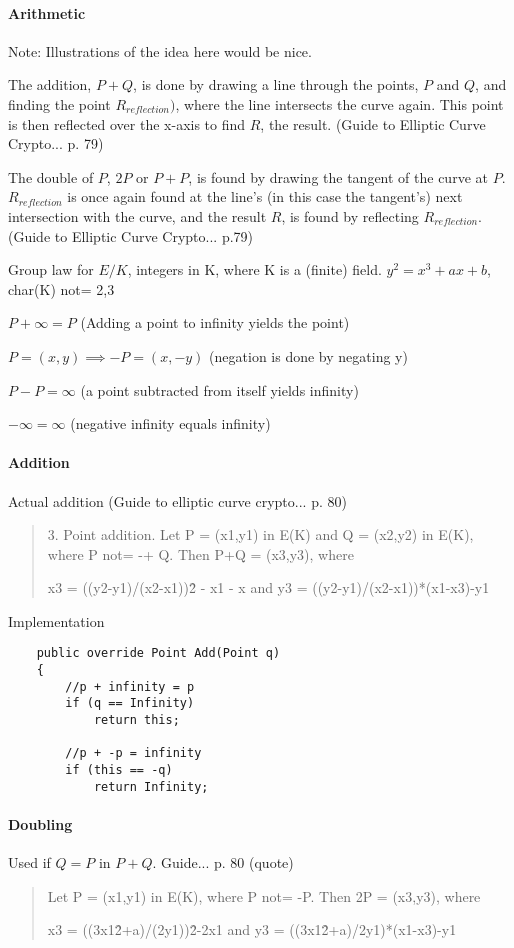 \paragraph{Arithmetic}

Note: Illustrations of the idea here would be nice.

The addition, \(P + Q\), is done by drawing a line through the points, \(P\) and \(Q\),
and finding the point \(R_{reflection})\), where the line intersects the curve again. This point is
then reflected over the x-axis to find \(R\), the result. (Guide to Elliptic Curve Crypto... p. 79)

The double of \(P\), \(2P\) or \(P+P\), is found by drawing the tangent of the curve at \(P\).
\(R_{reflection}\) is once again found at the line's (in this case the tangent's) next intersection
with the curve, and the result \(R\), is found by reflecting \(R_{reflection}\). (Guide to Elliptic Curve Crypto... p.79)

Group law for \(E/K\), integers in K, where K is a (finite) field.
\(y^2 = x^3 + ax + b\), char(K) not= 2,3

\(P + \infty = P\) (Adding a point to infinity yields the point)

\(P=(x,y) \implies -P=(x,-y)\) (negation is done by negating y)

\(P - P = \infty\) (a point subtracted from itself yields infinity)

\(-\infty = \infty\) (negative infinity equals infinity)

\paragraph{Addition}

Actual addition (Guide to elliptic curve crypto... p. 80)
\begin{quote}
	3. Point addition. Let P = (x1,y1) in E(K) and Q = (x2,y2) in E(K), where P not= -+ Q.
	Then P+Q = (x3,y3), where
	
	x3 = ((y2-y1)/(x2-x1))\^2 - x1 - x    and    y3 = ((y2-y1)/(x2-x1))*(x1-x3)-y1
\end{quote}

Implementation
\begin{verbatim}
	public override Point Add(Point q)
	{
	    //p + infinity = p
	    if (q == Infinity)
	        return this;

	    //p + -p = infinity
	    if (this == -q)
	        return Infinity;
\end{verbatim}

\paragraph{Doubling}

Used if \(Q = P\) in \(P + Q\). Guide... p. 80 (quote)
\begin{quote}
	Let P = (x1,y1) in E(K), where P not= -P. Then 2P = (x3,y3), where
	
	x3 = ((3x1\^2+a)/(2y1))\^2-2x1    and    y3 = ((3x1\^2+a)/2y1)*(x1-x3)-y1
\end{quote}